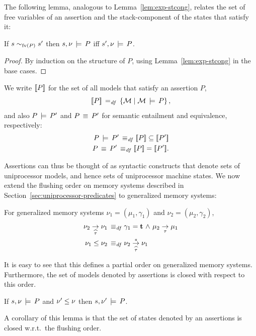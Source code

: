 \documentclass[11pt]{report}         %
\begin{document}
The following lemma, analogous to Lemma~\ref{lem:exp-stcong}, relates the set of free variables of an assertion and the stack-component of the states that satisfy it:
\begin{proposition}
\label{lem:assertion-stcong}
    If $s \sim_{\mathrm{fv}(P)} s'$ then $s,\nu \,\models\, P$ iff $s',\nu \,\models\, P$. 
\end{proposition}
\begin{proof}
By induction on the structure of $P$, using Lemma~\ref{lem:exp-stcong} in the base cases. 
\end{proof}

We write $[\![P]\!]$ for the set of all models that satisfy an assertion $P$,\[ [\![P]\!] \operatorname{\;=_{\mathit{df}}\;} \left\lbrace \mathcal{M} \mid \mathcal{M} \,\models\, P \right\rbrace,\] and also $P \,\models\, P'$ and $P \,\equiv\, P'$ for semantic entailment and equivalence, respectively: \begin{align*}
    P \sentails P' \iffdef \pred{P} \subseteq \pred{P'} \\
    P \sequiv P' \iffdef \pred{P} = \pred{P'}.
\end{align*} 

Assertions can thus be thought of as syntactic constructs that denote sets of uniprocessor models, and hence sets of uniprocessor machine states. We now extend the flushing order on memory systems described in Section~\ref{sec:uniprocessor-predicates} to generalized memory systems: 
\begin{definition}
  For generalized memory systems $\nu_1 = (\mu_1,\gamma_1)$ and $\nu_2 = (\mu_2,\gamma_2)$, \begin{align*}
  \nu_2 \underset{\widehat{\tau}}{\rightarrow} \nu_1 \operatorname{\;\equiv_{\mathit{df}}\;} & \gamma_1 = \mathbf{t} \operatorname{\,\wedge\,} \mu_2 \underset{\tau}{\rightarrow} \mu_1 \\ 
  \nu_1 \leq \nu_2 \operatorname{\;\equiv_{\mathit{df}}\;} & \nu_2 \overset{\ast}{\underset{\widehat{\tau}}{\rightarrow}} \nu_1
  \end{align*} 
\end{definition} It is easy to see that this defines a partial order on generalized memory systems. Furthermore, the set of models denoted by assertions is closed with respect to this order. 

\begin{proposition}
    \label{lem:assertions-denote-predicates}
    If $s,\nu \,\models\, P$ and $\nu' \leq \nu$ then $s,\nu' \,\models\, P$. 
\end{proposition}

A corollary of this lemma is that the set of states denoted by an assertions is closed w.r.t.\ the flushing order.  
\end{document}
